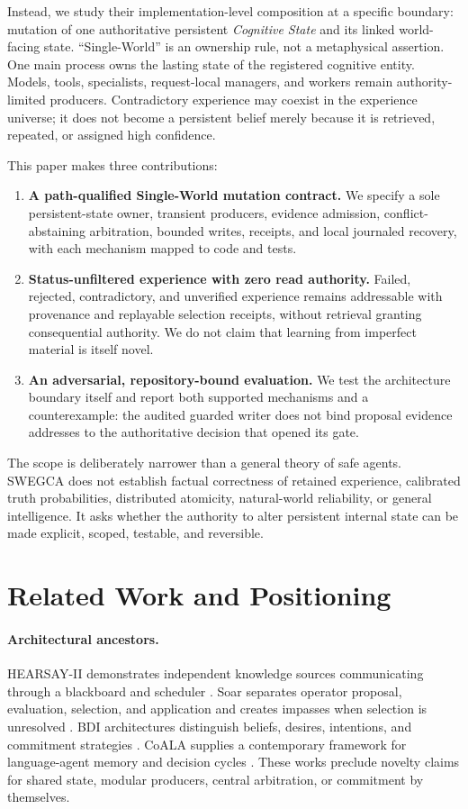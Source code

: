 \documentclass[10pt]{article}
\newcommand{\swegca}{\textsc{SWEGCA}}
\newcommand{\cstate}{\textit{Cognitive State}}
\begin{document}
Instead, we study their implementation-level composition at a specific boundary: mutation of one authoritative persistent \cstate{} and its linked world-facing state. ``Single-World'' is an ownership rule, not a metaphysical assertion. One main process owns the lasting state of the registered cognitive entity. Models, tools, specialists, request-local managers, and workers remain authority-limited producers. Contradictory experience may coexist in the experience universe; it does not become a persistent belief merely because it is retrieved, repeated, or assigned high confidence.

This paper makes three contributions:
\begin{enumerate}[leftmargin=*,itemsep=2pt]
  \item \textbf{A path-qualified Single-World mutation contract.} We specify a sole persistent-state owner, transient producers, evidence admission, conflict-abstaining arbitration, bounded writes, receipts, and local journaled recovery, with each mechanism mapped to code and tests.
  \item \textbf{Status-unfiltered experience with zero read authority.} Failed, rejected, contradictory, and unverified experience remains addressable with provenance and replayable selection receipts, without retrieval granting consequential authority. We do not claim that learning from imperfect material is itself novel.
  \item \textbf{An adversarial, repository-bound evaluation.} We test the architecture boundary itself and report both supported mechanisms and a counterexample: the audited guarded writer does not bind proposal evidence addresses to the authoritative decision that opened its gate.
\end{enumerate}

The scope is deliberately narrower than a general theory of safe agents. \swegca{} does not establish factual correctness of retained experience, calibrated truth probabilities, distributed atomicity, natural-world reliability, or general intelligence. It asks whether the authority to alter persistent internal state can be made explicit, scoped, testable, and reversible.

\section{Related Work and Positioning}

\paragraph{Architectural ancestors.}
HEARSAY-II demonstrates independent knowledge sources communicating through a blackboard and scheduler \cite{erman1980hearsay}. Soar separates operator proposal, evaluation, selection, and application and creates impasses when selection is unresolved \cite{laird2022soar}. BDI architectures distinguish beliefs, desires, intentions, and commitment strategies \cite{rao1995bdi}. CoALA supplies a contemporary framework for language-agent memory and decision cycles \cite{sumers2024coala}. These works preclude novelty claims for shared state, modular producers, central arbitration, or commitment by themselves.
\end{document}
